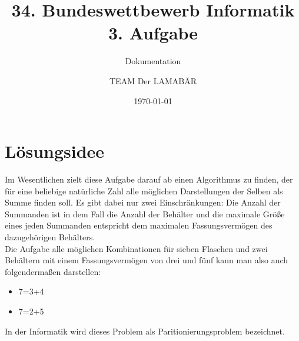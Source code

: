 \documentclass[10pt,a4paper]{scrartcl}
\author{TEAM \glqq{}Der LAMABÄR\grqq{}}
\date{\today}
\title{34. Bundeswettbewerb Informatik\\3. Aufgabe}
\subtitle{Dokumentation}
\begin{document}
\maketitle
\tableofcontents
\section{Lösungsidee}
Im Wesentlichen zielt diese Aufgabe darauf ab einen Algorithmus zu finden, der für eine beliebige natürliche Zahl alle möglichen Darstellungen der Selben als Summe finden soll. Es gibt dabei nur zwei Einschränkungen: Die Anzahl der Summanden ist in dem Fall die Anzahl der Behälter und die maximale Größe eines jeden Summanden entspricht dem maximalen Fassungsvermögen des dazugehörigen Behälters.\\
Die Aufgabe alle möglichen Kombinationen für sieben Flaschen und zwei Behältern mit einem Fassungsvermögen von drei und fünf kann man also auch folgendermaßen darstellen:
\begin{itemize}
\item 7=3+4
\item 7=2+5
\end{itemize}
In der Informatik wird dieses Problem als Paritionierungsproblem bezeichnet.\\
\end{document}
